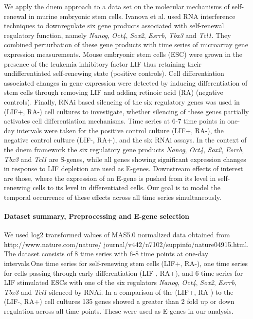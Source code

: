\documentclass[11pt,a4paper]{article}
\begin{document}
We apply the dnem approach to a data set on the molecular mechanisms of self-renewal in murine embryonic 
stem cells. Ivanova et al.  used RNA interference techniques to downregulate six gene 
products associated with self-renewal regulatory function, namely  \textit{Nanog}, \textit{Oct4}, 
\textit{Sox2}, \textit{Esrrb}, \textit{Tbx3} and \textit{Tcl1}.
They combined perturbation of these gene products with time series of microarray gene expression measurements.
Mouse embryonic stem cells (ESC) were grown in the presence of the leukemia inhibitory factor LIF thus 
retaining their undifferentiated self-renewing state (positive controls).
Cell differentiation associated changes in gene expression were detected by inducing differentiation 
of stem cells through removing LIF and adding retinoic acid (RA) (negative controls).
Finally, RNAi based silencing of the six regulatory genes was used in 
(LIF+, RA-) cell cultures to investigate, whether silencing of these genes partially activates cell 
differentiation mechanisms. Time series at 6-7 time points in one-day intervals were taken for 
the positive control culture (LIF+, RA-), the negative control culture (LIF-, RA+), and the six RNAi 
assays.  
In the context of the dnem framework the six regulatory gene products \textit{Nanog}, \textit{Oct4}, 
\textit{Sox2}, \textit{Esrrb}, \textit{Tbx3} and \textit{Tcl1} are S-genes, while all genes 
showing significant expression changes in response to LIF depletion are used as E-genes.
Downstream effects of interest are those, where the expression of an E-gene is pushed from
its level in self-renewing cells to its level in differentiated cells.
Our goal is to model the temporal occurrence of these effects across all time series simultaneously.

\paragraph{Dataset summary, Preprocessing and E-gene selection}
We used log2 transformed values of MAS5.0 normalized data obtained from \\http://www.nature.com/nature/  journal/v442/n7102/suppinfo/nature04915.html. The dataset consists of 8 time series with 6-8 time points at one-day intervals.One time series for self-renewing stem cells (LIF+, RA-), one time series for cells passing through early 
differentiation (LIF-, RA+), and 6 time series for LIF stimulated ESCs with one of the six regulators 
\textit{Nanog}, \textit{Oct4}, \textit{Sox2}, \textit{Esrrb}, \textit{Tbx3} and \textit{Tcl1} silenced by RNAi. 
In a comparison of the (LIF+, RA-) to the (LIF-, RA+) cell cultures 135 genes showed a greater than 2 fold up or 
down regulation across all time points. These were used as E-genes in our analysis. 
\end{document}
